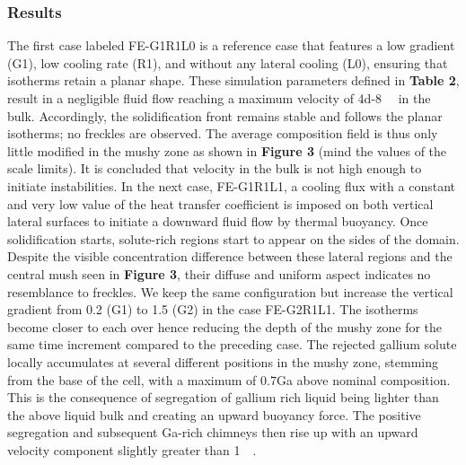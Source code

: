 \subsubsection{Results}
The first case labeled FE-G1R1L0 is a reference case that features a low gradient (G1), low cooling rate (R1), 
and without any lateral cooling (L0), ensuring that isotherms retain a planar shape. These simulation parameters 
defined in \textbf{Table 2}, result in a negligible fluid flow reaching a maximum velocity of \SI{4d-8}{\milli\uvelocity} in the bulk. 
Accordingly, the solidification front remains stable and follows the planar isotherms; no freckles are observed. 
The average composition field is thus only little modified in the mushy zone as shown in \textbf{Figure 3 }(mind the values of the scale limits). 
It is concluded that velocity in the bulk is not high enough to initiate instabilities. In the next case, FE-G1R1L1, 
a cooling flux with a constant and very low value of the heat transfer coefficient is imposed on both vertical lateral 
surfaces to initiate a downward fluid flow by thermal buoyancy. Once solidification starts, solute-rich regions start 
to appear on the sides of the domain. Despite the visible concentration difference between these lateral regions and 
the central mush seen in \textbf{Figure 3}, their diffuse and uniform aspect indicates no resemblance to freckles. We keep the 
same configuration but increase the vertical gradient from \SI{0.2}{\ugradT} (G1) to \SI{1.5}{\ugradT} (G2) in the case FE-G2R1L1. 
The isotherms become closer to each over hence reducing the depth of the mushy zone for the same time increment compared 
to the preceding case. The rejected gallium solute locally accumulates at several different positions in the mushy zone, 
stemming from the base of the cell, with a maximum of \SI{0.7}{\ucomposition}Ga above nominal composition. 
This is the consequence of segregation of gallium rich liquid being lighter than the above liquid bulk and creating an 
upward buoyancy force. The positive segregation and subsequent Ga-rich chimneys then rise up with an upward velocity 
component slightly greater than \SI{1}{\milli\uvelocity}.
%
